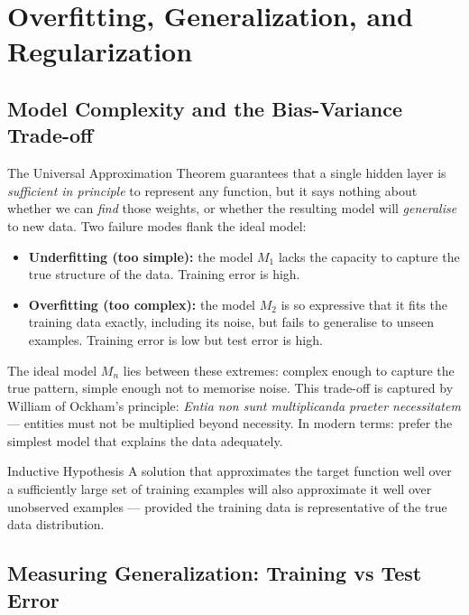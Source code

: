 \documentclass[11pt,a4paper]{article}
\begin{document}
\section{Overfitting, Generalization, and Regularization}

\subsection{Model Complexity and the Bias-Variance Trade-off}

The Universal Approximation Theorem guarantees that a single hidden layer is \emph{sufficient in principle} to represent any function, but it says nothing about whether we can \emph{find} those weights, or whether the resulting model will \emph{generalise} to new data. Two failure modes flank the ideal model:

\begin{itemize}
  \item \textbf{Underfitting (too simple):} the model $M_1$ lacks the capacity to capture the true structure of the data. Training error is high.
  \item \textbf{Overfitting (too complex):} the model $M_2$ is so expressive that it fits the training data exactly, including its noise, but fails to generalise to unseen examples. Training error is low but test error is high.
\end{itemize}

The ideal model $M_n$ lies between these extremes: complex enough to capture the true pattern, simple enough not to memorise noise. This trade-off is captured by William of Ockham's principle: \emph{Entia non sunt multiplicanda praeter necessitatem} --- entities must not be multiplied beyond necessity. In modern terms: prefer the simplest model that explains the data adequately.

\begin{defbox}{Inductive Hypothesis}
A solution that approximates the target function well over a sufficiently large set of training examples will also approximate it well over unobserved examples — provided the training data is representative of the true data distribution.
\end{defbox}

\subsection{Measuring Generalization: Training vs Test Error}
\end{document}
